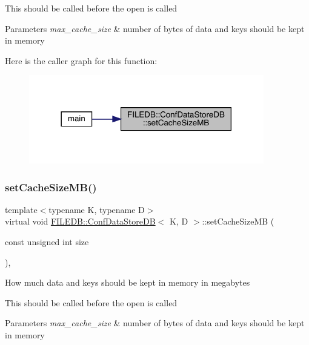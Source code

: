 This should be called before the open is called 
\begin{DoxyParams}{Parameters}
{\em max\+\_\+cache\+\_\+size} & number of bytes of data and keys should be kept in memory \\
\hline
\end{DoxyParams}
Here is the caller graph for this function\+:
\nopagebreak
\begin{figure}[H]
\begin{center}
\leavevmode
\includegraphics[width=290pt]{d8/d19/classFILEDB_1_1ConfDataStoreDB_aa5fafbdd147d1b66d8fcc6821dc3804f_icgraph}
\end{center}
\end{figure}
\mbox{\label{classFILEDB_1_1ConfDataStoreDB_aa5fafbdd147d1b66d8fcc6821dc3804f}} 
\subsubsection{\texorpdfstring{setCacheSizeMB()}{setCacheSizeMB()}\hspace{0.1cm}{\footnotesize\ttfamily [2/3]}}
{\footnotesize\ttfamily template$<$typename K, typename D$>$ \\
virtual void \mbox{\hyperlink{classFILEDB_1_1ConfDataStoreDB}{F\+I\+L\+E\+D\+B\+::\+Conf\+Data\+Store\+DB}}$<$ K, D $>$\+::set\+Cache\+Size\+MB (\begin{DoxyParamCaption}\item[{const unsigned int}]{size }\end{DoxyParamCaption})\hspace{0.3cm}{\ttfamily [inline]}, {\ttfamily [virtual]}}

How much data and keys should be kept in memory in megabytes

This should be called before the open is called 
\begin{DoxyParams}{Parameters}
{\em max\+\_\+cache\+\_\+size} & number of bytes of data and keys should be kept in memory \\
\hline
\end{DoxyParams}
\mbox{\label{classFILEDB_1_1ConfDataStoreDB_aa5fafbdd147d1b66d8fcc6821dc3804f}} 
